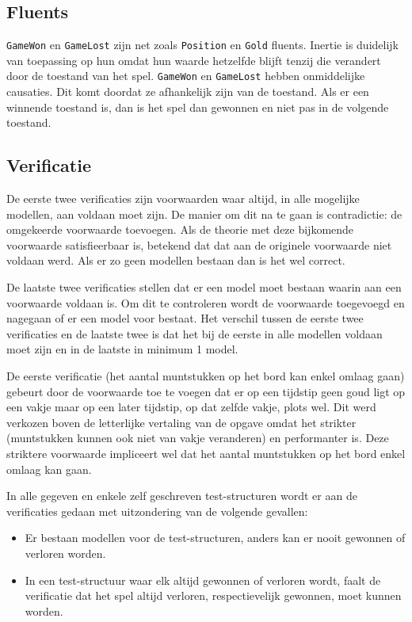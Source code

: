 \documentclass[a4paper,12pt]{article}
\begin{document}
\subsection{Fluents}
\texttt{GameWon} en \texttt{GameLost} zijn net zoals \texttt{Position} en \texttt{Gold} fluents. Inertie is duidelijk van toepassing op hun omdat hun waarde hetzelfde blijft tenzij die verandert door de toestand van het spel. \texttt{GameWon} en \texttt{GameLost} hebben onmiddelijke causaties. Dit komt doordat ze afhankelijk zijn van de toestand. Als er een winnende toestand is, dan is het spel dan gewonnen en niet pas in de volgende toestand.

\subsection{Verificatie}
De eerste twee verificaties zijn voorwaarden waar altijd, in alle mogelijke modellen, aan voldaan moet zijn. De manier om dit na te gaan is contradictie: de omgekeerde voorwaarde toevoegen. Als de theorie met deze bijkomende voorwaarde satisfieerbaar is, betekend dat dat aan de originele voorwaarde niet voldaan werd. Als er zo geen modellen bestaan dan is het wel correct.

De laatste twee verificaties stellen dat er een model moet bestaan waarin aan een voorwaarde voldaan is. Om dit te controleren wordt de voorwaarde toegevoegd en nagegaan of er een model voor bestaat. Het verschil tussen de eerste twee verificaties en de laatste twee is dat het bij de eerste in alle modellen voldaan moet zijn en in de laatste in minimum 1 model.

De eerste verificatie (het aantal muntstukken op het bord kan enkel omlaag gaan) gebeurt door de voorwaarde toe te voegen dat er op een tijdstip geen goud ligt op een vakje maar op een later tijdstip, op dat zelfde vakje, plots wel. Dit werd verkozen boven de letterlijke vertaling van de opgave omdat het strikter (muntstukken kunnen ook niet van vakje veranderen) en performanter is. Deze striktere voorwaarde impliceert wel dat het aantal muntstukken op het bord enkel omlaag kan gaan.

In alle gegeven en enkele zelf geschreven test-structuren wordt er aan de verificaties gedaan met uitzondering van de volgende gevallen:
\begin{itemize}
\item Er bestaan modellen voor de test-structuren, anders kan er nooit gewonnen of verloren worden.
\item In een test-structuur waar elk altijd gewonnen of verloren wordt, faalt de verificatie dat het spel altijd verloren, respectievelijk gewonnen, moet kunnen worden.
\end{itemize}
\end{document}
